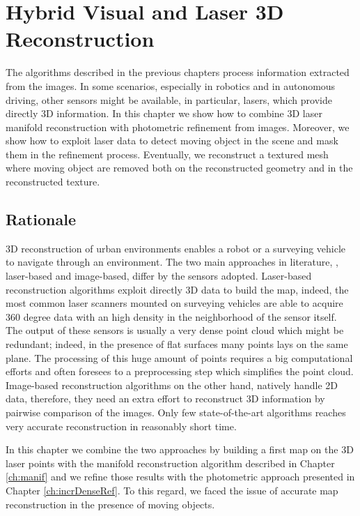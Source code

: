 \chapter[Hybrid Visual and Laser 3D Reconstruction]{Hybrid Visual and Laser 3D Reconstruction}
\label{ch:laser}
The algorithms described in the previous chapters process information extracted from the images. 
In some scenarios, especially in robotics and in autonomous driving, other sensors might be available, in particular, lasers, which provide directly 3D information.
In this chapter we show how to combine 3D laser manifold reconstruction with photometric refinement from images.
Moreover, we show how to exploit laser data to detect moving object in the scene and mask them in the refinement process. 
Eventually, we reconstruct a textured mesh where moving object are removed both on the reconstructed geometry and in the reconstructed texture.

\minitoc
\newpage
\section{Rationale}
3D reconstruction of urban environments enables a robot or a surveying vehicle to navigate through an environment.
The two main approaches in literature, \ie, laser-based and image-based, differ by the sensors adopted. 
Laser-based reconstruction algorithms exploit directly 3D data to build the map, indeed, the most common laser scanners mounted on surveying vehicles are able to acquire 360 degree data with an high density in the neighborhood of the sensor itself. 
The output of these sensors is usually a very dense point cloud which might be redundant; indeed, in the presence of flat surfaces many points lays on the same plane. The processing of this huge amount of points requires a big computational efforts and often foresees to a preprocessing step which simplifies the point cloud.
Image-based reconstruction algorithms on the other hand, natively handle 2D data, therefore, they need an extra effort to  reconstruct 3D information by pairwise comparison of the images. Only few state-of-the-art algorithms \cite{vu_et_al_2012,li2015detail} reaches very accurate reconstruction in reasonably short time.

In this chapter we combine the two approaches by building a first map on the 3D laser points with the manifold reconstruction algorithm described in Chapter \ref{ch:manif} and we refine those results with the photometric approach presented in Chapter \ref{ch:incrDenseRef}.
To this regard, we faced the issue of accurate map reconstruction in the presence of moving objects.

